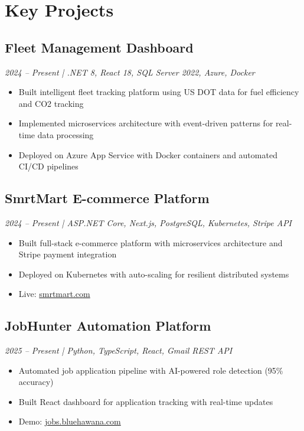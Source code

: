 \documentclass[10pt,a4paper]{article}
\begin{document}
\section*{Key Projects}

\subsection*{Fleet Management Dashboard}
\textit{2024 -- Present | .NET 8, React 18, SQL Server 2022, Azure, Docker}
\begin{itemize}[noitemsep,leftmargin=*]
\item Built intelligent fleet tracking platform using US DOT data for fuel efficiency and CO2 tracking
\item Implemented microservices architecture with event-driven patterns for real-time data processing
\item Deployed on Azure App Service with Docker containers and automated CI/CD pipelines
\end{itemize}

\subsection*{SmrtMart E-commerce Platform}
\textit{2024 -- Present | ASP.NET Core, Next.js, PostgreSQL, Kubernetes, Stripe API}
\begin{itemize}[noitemsep,leftmargin=*]
\item Built full-stack e-commerce platform with microservices architecture and Stripe payment integration
\item Deployed on Kubernetes with auto-scaling for resilient distributed systems
\item Live: \href{https://www.smrtmart.com}{smrtmart.com}
\end{itemize}

\subsection*{JobHunter Automation Platform}
\textit{2025 -- Present | Python, TypeScript, React, Gmail REST API}
\begin{itemize}[noitemsep,leftmargin=*]
\item Automated job application pipeline with AI-powered role detection (95\% accuracy)
\item Built React dashboard for application tracking with real-time updates
\item Demo: \href{https://jobs.bluehawana.com}{jobs.bluehawana.com}
\end{itemize}
\end{document}
